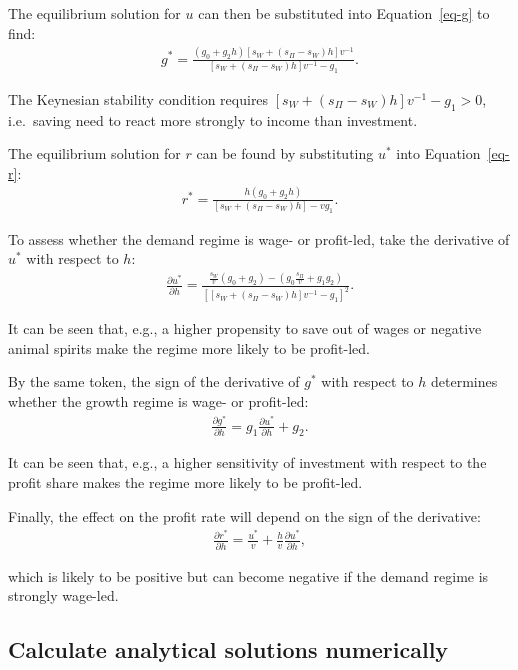 \documentclass[
  letterpaper,
  DIV=11,
  numbers=noendperiod]{scrreprt}
\begin{document}
The equilibrium solution for \(u\) can then be substituted into
Equation~\ref{eq-g} to find: \begin{align}
g^* = \frac{(g_0+g_2h)[s_W + (s_\Pi - s_W)h]v^{-1}}{[s_W + (s_\Pi - s_W)h]v^{-1}-g_1}.
\end{align}

The Keynesian stability condition requires
\([s_W + (s_\Pi - s_W)h]v^{-1}-g_1>0\), i.e.~saving need to react more
strongly to income than investment.

The equilibrium solution for \(r\) can be found by substituting \(u^*\)
into Equation~\ref{eq-r}: \begin{align}
r^* = \frac{h(g_0+g_2h)}{[s_W + (s_\Pi - s_W)h]-vg_1}.
\end{align}

To assess whether the demand regime is wage- or profit-led, take the
derivative of \(u^*\) with respect to \(h\): \begin{align}
\frac{\partial u^*}{\partial h} = \frac{\frac{s_W}{v}(g_0+g_2 )-(g_0\frac{s_\Pi}{v} + g_1g_2)}{[[s_W + (s_\Pi - s_W)h]v^{-1}-g_1]^2}.
\end{align}

It can be seen that, e.g., a higher propensity to save out of wages or
negative animal spirits make the regime more likely to be profit-led.

By the same token, the sign of the derivative of \(g^*\) with respect to
\(h\) determines whether the growth regime is wage- or profit-led:
\begin{align}
\frac{\partial g^*}{\partial h} = g_1\frac{\partial u^*}{\partial h}+g_2.
\end{align}

It can be seen that, e.g., a higher sensitivity of investment with
respect to the profit share makes the regime more likely to be
profit-led.

Finally, the effect on the profit rate will depend on the sign of the
derivative: \begin{align}
\frac{\partial r^*}{\partial h} = \frac{u^*}{v} + \frac{h}{v}\frac{\partial u^*}{\partial h},
\end{align}

which is likely to be positive but can become negative if the demand
regime is strongly wage-led.

\subsection{Calculate analytical solutions
numerically}\label{calculate-analytical-solutions-numerically-1}
\end{document}
